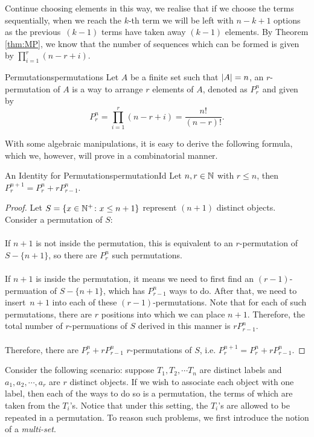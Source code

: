 \documentclass[math]{amznotes}
\theoremstyle{remark}
\newcommand{\0}{\mathbf{0}}
\newcommand{\1}{\mathbf{1}}
\begin{document}
Continue choosing elements in this way, we realise that if we choose the terms sequentially, when we reach the $k$-th term we will be left with $n - k + 1$ options as the previous~$(k - 1)$ terms have taken away $(k - 1)$ elements. By Theorem \ref{thm:MP}, we know that the number of sequences which can be formed is given by $\prod_{i = 1}^{r}(n - r + i)$.
\begin{dfnbox}{Permutations}{permutations}
    Let $A$ be a finite set such that ${\left\lvert {A} \right\rvert} = n$, an $r$-permutation of $A$ is a way to arrange $r$ elements of $A$, denoted as $P^n_r$ and given by
    \begin{equation*}
        P^n_r = \prod_{i = 1}^{r}(n - r + i) = \frac{n!}{(n - r)!}.
    \end{equation*}
\end{dfnbox}
With some algebraic manipulations, it is easy to derive the following formula, which we, however, will prove in a combinatorial manner.
\begin{probox}{An Identity for Permutations}{permutationId}
    Let $n, r \in \mathbb{N}$ with $r \leq n$, then $P^{n + 1}_r = P^n_r + rP^n_{r - 1}$.
    \tcblower
    \begin{proof}
        Let $S = \left\{x \in \mathbb{N}^+ \colon x \leq n + 1\right\}$ represent $(n + 1)$ distinct objects. Consider a permutation of $S$:
        \\\\
        If $n + 1$ is not inside the permutation, this is equivalent to an $r$-permutation of~$S - \{n + 1\}$, so there are $P^n_r$ such permutations.
        \\\\
    If $n + 1$ is inside the permutation, it means we need to first find an $(r - 1)$-permuation of $S - \{n + 1\}$, which has $P^n_{r - 1}$ ways to do. After that, we need to insert~$n + 1$ into each of these $(r - 1)$-permutations. Note that for each of such permutations, there are $r$ positions into which we can place $n + 1$. Therefore, the total number of $r$-permuations of $S$ derived in this manner is $rP^n_{r - 1}$.
        \\\\
        Therefore, there are $P^n_{r} + rP^n_{r - 1}$ $r$-permutations of $S$, i.e. $P^{n + 1}_r = P^n_r + rP^n_{r - 1}$. 
    \end{proof}
\end{probox}
Consider the following scenario: suppose $T_1, T_2, \cdots T_n$ are distinct labels and $a_1, a_2, \cdots, a_r$ are $r$ distinct objects. If we wish to associate each object with one label, then each of the ways to do so is a permutation, the terms of which are taken from the $T_i$'s. Notice that under this setting, the $T_i$'s are allowed to be repeated in a permutation. To reason such problems, we first introduce the notion of a \textit{multi-set}.
\end{document}
